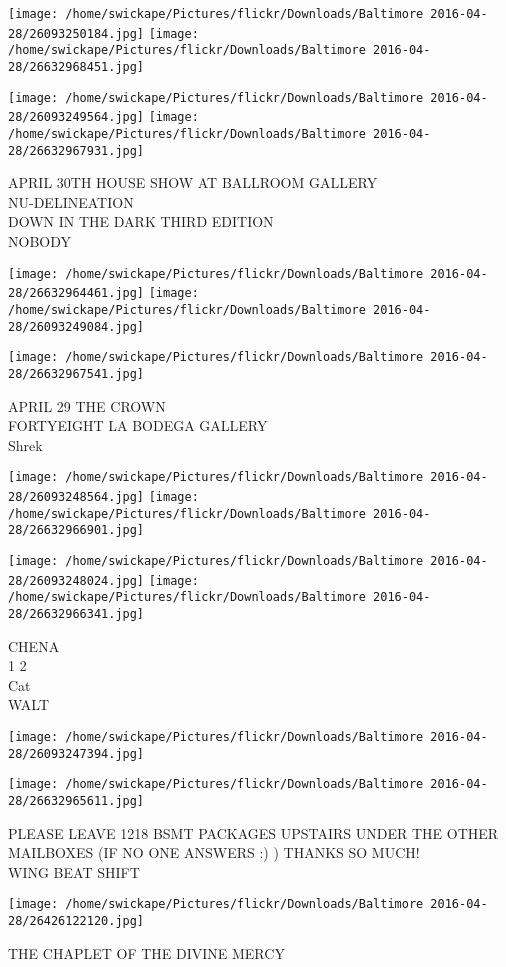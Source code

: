 \documentclass[10pt,letterpaper]{article}
\begin{document}
\texttt{[image: /home/swickape/Pictures/flickr/Downloads/Baltimore 2016-04-28/26093250184.jpg]}
\texttt{[image: /home/swickape/Pictures/flickr/Downloads/Baltimore 2016-04-28/26632968451.jpg]}

\texttt{[image: /home/swickape/Pictures/flickr/Downloads/Baltimore 2016-04-28/26093249564.jpg]}
\texttt{[image: /home/swickape/Pictures/flickr/Downloads/Baltimore 2016-04-28/26632967931.jpg]}

APRIL 30TH HOUSE SHOW AT BALLROOM GALLERY\\
NU{-}DELINEATION\\
DOWN IN THE DARK THIRD EDITION\\
NOBODY\\
\pagebreak

\texttt{[image: /home/swickape/Pictures/flickr/Downloads/Baltimore 2016-04-28/26632964461.jpg]}
\texttt{[image: /home/swickape/Pictures/flickr/Downloads/Baltimore 2016-04-28/26093249084.jpg]}

\vspace{0.25in}
\texttt{[image: /home/swickape/Pictures/flickr/Downloads/Baltimore 2016-04-28/26632967541.jpg]}

APRIL 29 THE CROWN\\
FORTYEIGHT LA BODEGA GALLERY\\
Shrek\\
\pagebreak

\texttt{[image: /home/swickape/Pictures/flickr/Downloads/Baltimore 2016-04-28/26093248564.jpg]}
\texttt{[image: /home/swickape/Pictures/flickr/Downloads/Baltimore 2016-04-28/26632966901.jpg]}

\texttt{[image: /home/swickape/Pictures/flickr/Downloads/Baltimore 2016-04-28/26093248024.jpg]}
\texttt{[image: /home/swickape/Pictures/flickr/Downloads/Baltimore 2016-04-28/26632966341.jpg]}

CHENA\\
1 2\\
Cat\\
WALT\\
\pagebreak

\texttt{[image: /home/swickape/Pictures/flickr/Downloads/Baltimore 2016-04-28/26093247394.jpg]}

\vspace{0.25in}
\texttt{[image: /home/swickape/Pictures/flickr/Downloads/Baltimore 2016-04-28/26632965611.jpg]}

PLEASE LEAVE 1218 BSMT PACKAGES UPSTAIRS UNDER THE OTHER MAILBOXES (IF NO ONE ANSWERS :) )  THANKS SO MUCH!\\
WING BEAT SHIFT\\
\pagebreak

\texttt{[image: /home/swickape/Pictures/flickr/Downloads/Baltimore 2016-04-28/26426122120.jpg]}

THE CHAPLET OF THE DIVINE MERCY\\
\pagebreak
\end{document}
